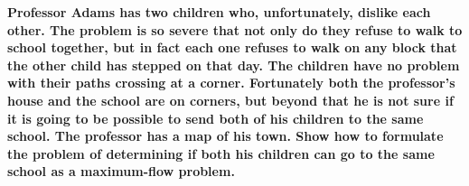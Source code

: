\textbf{Professor Adams has two children who, unfortunately, dislike each other. The problem is so severe that not only do they refuse to walk to school together, but in fact each one refuses to walk on any block that the other child has stepped on that day. The children have no problem with their paths crossing at a corner. Fortunately both the professor’s house and the school are on corners, but beyond that he is not sure if it is going to be possible to send both of his children to the same school. The professor has a map of his town. Show how to formulate the problem of determining if both his children can go to the same school as a maximum-flow problem.}\vspace{.2cm}

\textcolor{bibi}{}
\begin{quote}
\end{quote}